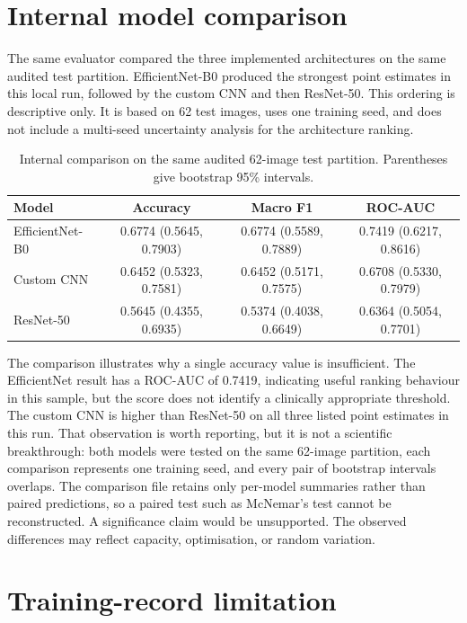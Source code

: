 \section{Internal model comparison}
The same evaluator compared the three implemented architectures on the same audited test partition. EfficientNet-B0 produced the strongest point estimates in this local run, followed by the custom CNN and then ResNet-50. This ordering is descriptive only. It is based on 62 test images, uses one training seed, and does not include a multi-seed uncertainty analysis for the architecture ranking.

\begin{table}[htbp]
\centering
\caption{Internal comparison on the same audited 62-image test partition. Parentheses give bootstrap 95\% intervals.}
\label{tab:model_comparison}
\scriptsize
\begin{tabular}{@{}lccc@{}}
\toprule
\textbf{Model} & \textbf{Accuracy} & \textbf{Macro F1} & \textbf{ROC-AUC} \\
\midrule
EfficientNet-B0 & 0.6774 (0.5645, 0.7903) & 0.6774 (0.5589, 0.7889) & 0.7419 (0.6217, 0.8616) \\
Custom CNN & 0.6452 (0.5323, 0.7581) & 0.6452 (0.5171, 0.7575) & 0.6708 (0.5330, 0.7979) \\
ResNet-50 & 0.5645 (0.4355, 0.6935) & 0.5374 (0.4038, 0.6649) & 0.6364 (0.5054, 0.7701) \\
\bottomrule
\end{tabular}
\end{table}

The comparison illustrates why a single accuracy value is insufficient. The EfficientNet result has a ROC-AUC of 0.7419, indicating useful ranking behaviour in this sample, but the score does not identify a clinically appropriate threshold. The custom CNN is higher than ResNet-50 on all three listed point estimates in this run. That observation is worth reporting, but it is not a scientific breakthrough: both models were tested on the same 62-image partition, each comparison represents one training seed, and every pair of bootstrap intervals overlaps. The comparison file retains only per-model summaries rather than paired predictions, so a paired test such as McNemar's test cannot be reconstructed. A significance claim would be unsupported. The observed differences may reflect capacity, optimisation, or random variation.

\section{Training-record limitation}

